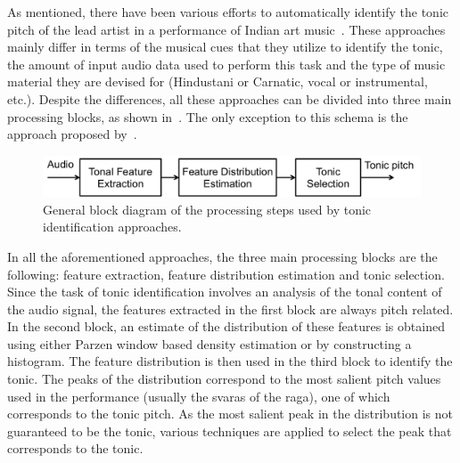 As mentioned, there have been various efforts to automatically identify the tonic pitch of the lead artist in a performance of Indian art music~\citep{salamon2012multipitch,gulati2012two,bellur2012knowledge,ranjani2011carnatic,Sengupta2005b}. These approaches mainly differ in terms of the musical cues that they utilize to identify the tonic, the amount of input audio data used to perform this task and the type of music material they are devised for (Hindustani or Carnatic, vocal or
instrumental, etc.). Despite the differences, all these approaches can be divided into three main processing blocks, as shown in~. The only exception to this schema is the approach proposed by~\cite{Sengupta2005b}.

\begin{figure}
	\begin{center}
		\includegraphics[width=\figSizeNinety]{ch05_preprocessing/figures/tonic_identification_block_diagram.pdf}
	\end{center}
	\caption[General block diagram of the processing steps used by tonic identification
	approaches.]{General block diagram of the processing steps used by tonic identification
		approaches.}
	\label{fig:tonic_identification_general_block_diagram}
\end{figure}


In all the aforementioned approaches, the three main processing blocks are the following: feature extraction, feature distribution estimation and tonic selection. Since the task of tonic identification involves an analysis of the tonal content of the audio signal, the features extracted in the first block are always pitch related. In the second block, an estimate of the distribution of these features is obtained using either Parzen window based density estimation or by constructing a histogram. The feature distribution is then used in the third block to identify the tonic. The peaks of the distribution correspond to the most salient pitch values used in the performance (usually the \glspl{svara} of the \gls{raga}), one of which corresponds to the tonic pitch. As the most salient peak in the distribution is not guaranteed to be the tonic, various techniques are applied to select the peak that corresponds to the tonic.

